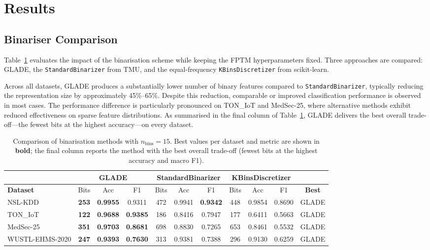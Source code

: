 \documentclass[journal,twoside,web]{ieeecolor}
\begin{document}
\section{Results}
\label{sec:results}

\subsection{Binariser Comparison}
\label{sec:res-binarisers}

Table~\ref{tab:binarizer_comparison} evaluates the impact of the
binarisation scheme while keeping the FPTM hyperparameters fixed.
Three approaches are compared: GLADE, the \texttt{StandardBinarizer}
from TMU, and the equal-frequency \texttt{KBinsDiscretizer} from
scikit-learn.

Across all datasets, GLADE produces a substantially lower number of
binary features compared to \texttt{StandardBinarizer}, typically
reducing the representation size by approximately 45\%--65\%.
Despite this reduction, comparable or improved classification
performance is observed in most cases. The performance difference is
particularly pronounced on TON\_IoT and MedSec-25, where alternative
methods exhibit reduced effectiveness on sparse feature distributions.
As summarised in the final column of
Table~\ref{tab:binarizer_comparison}, GLADE delivers the best overall
trade-off---the fewest bits at the highest accuracy---on every
dataset.

\begin{table}[t]
\centering
\renewcommand{\arraystretch}{1.2}
\small
\caption{Comparison of binarisation methods with $n_\text{bins}=15$.
Best values per dataset and metric are shown in \textbf{bold}; the
final column reports the method with the best overall trade-off
(fewest bits at the highest accuracy and macro F1).}
\label{tab:binarizer_comparison}
\begin{tabular}{|l|ccc|ccc|ccc|c|}
\hline
 & \multicolumn{3}{c|}{\textbf{GLADE}}
 & \multicolumn{3}{c|}{\textbf{StandardBinarizer}}
 & \multicolumn{3}{c|}{\textbf{KBinsDiscretizer}} & \\
\hline
\textbf{Dataset} & Bits & Acc & F1 & Bits & Acc & F1 & Bits & Acc & F1 & \textbf{Best} \\
\hline
NSL-KDD         & \textbf{253} & \textbf{0.9955} & 0.9311          & 472 & 0.9941 & \textbf{0.9342} & 448 & 0.9854 & 0.8690 & GLADE \\
\hline
TON\_IoT        & \textbf{122} & \textbf{0.9688} & \textbf{0.9385} & 186 & 0.8416 & 0.7947          & 177 & 0.6411 & 0.5663 & GLADE \\
\hline
MedSec-25       & \textbf{351} & \textbf{0.9703} & \textbf{0.8681} & 698 & 0.8830 & 0.7265          & 653 & 0.8461 & 0.5532 & GLADE \\
\hline
WUSTL-EHMS-2020 & \textbf{247} & \textbf{0.9393} & \textbf{0.7630} & 313 & 0.9381 & 0.7388          & 296 & 0.9130 & 0.6259 & GLADE \\
\hline
\end{tabular}
\end{table}
\end{document}
